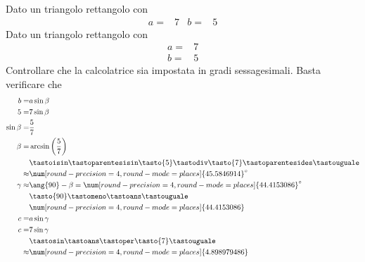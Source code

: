 \begin{exercise}
	Dato un triangolo rettangolo con
	\begin{align*}
	a=&7&
	b=&5
	\end{align*}
	\tcblower
		Dato un triangolo rettangolo con
	\begin{align*}
	a=&7\\
	b=&5
	\end{align*}
	Controllare che la calcolatrice sia impostata in gradi sessagesimali.
	Basta verificare che \testgradi 
	\begin{align*}
	b=&a\sin\beta\\
	5=&7\sin\beta\\
	\sin\beta=&\dfrac{5}{7}\\
	\beta=&\arcsin\left(\dfrac{5}{7}\right)\\
	&\tastoisin\tastoparentesisin\tasto{5}\tastodiv\tasto{7}\tastoparentesides\tastouguale\\
	\approx&\num[round-precision=\lungarrotandamento,round-mode=places]{45.5846914}^\circ\\
	\gamma\approx&\ang{90}-\beta=\num[round-precision=\lungarrotandamento,round-mode=places]{44.4153086}^\circ\\
	&\tasto{90}\tastomeno\tastoans\tastouguale\\
	&\num[round-precision=\lungarrotandamento,round-mode=places]{44.4153086}\\
	c=&a\sin\gamma\\
	c=&7\sin\gamma\\
	&\tastosin\tastoans\tastoper\tasto{7}\tastouguale\\
	\approx&\num[round-precision=\lungarrotandamento,round-mode=places]{4.898979486}\\
	\end{align*}
\end{exercise}

